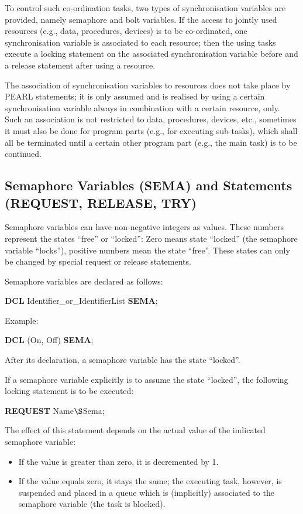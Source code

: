 To control such co-ordination tasks, two types of synchronisation
variables are provided, namely semaphore and bolt variables. If the
access to jointly used resources (e.g., data, procedures, devices) is to
be co-ordinated, one synchronisation variable is associated to each
resource; then the using tasks execute a locking statement on the
associated synchronisation variable before and a release statement
after using a resource.

The association of synchronisation variables to resources does not take
place by PEARL statements; it is only assumed and is realised by using a
certain synchronisation variable always in combination with a certain
resource, only. Such an association is not restricted to data,
procedures, devices, etc., sometimes it must also be done for program
parts (e.g., for executing sub-tasks), which shall all be
terminated until a certain other program part (e.g., the main task) is to be
continued.

\subsection{Semaphore Variables (SEMA) and Statements (REQUEST,
RELEASE, TRY)} %

Semaphore variables can have non-negative integers as values. These
numbers represent the states ``free'' or ``locked'': Zero means state
``locked'' (the semaphore variable ``locks''), positive numbers mean the
state ``free''.  These states can only be changed by special request or
release statements.

Semaphore variables are declared as follows:

{\bf DCL} Identifier\_or\_IdentifierList {\bf SEMA};

Example:

{\bf DCL} (On, Off) {\bf SEMA};

After its declaration, a semaphore variable has the state ``locked''.

If a semaphore variable explicitly is to assume the state ``locked'',
the following locking statement is to be executed:

{\bf REQUEST} Name$\S $Sema;

The effect of this statement depends on the actual value of the
indicated semaphore variable:
\begin{itemize}
\item If the value is greater than zero, it is decremented by 1.
\item If the value equals zero, it stays the same; the executing task,
however, is suspended and placed in a queue which is (implicitly)
associated to the semaphore variable (the task is blocked).
\end{itemize}

